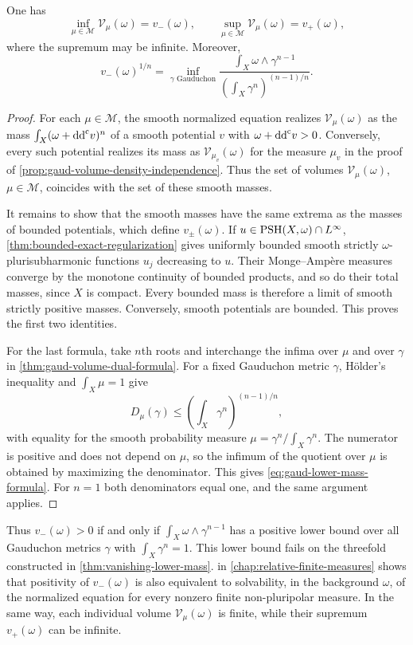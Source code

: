 \begin{theorem}\label{thm:gaud-volume-mass-extrema}
One has
\[
 \inf_{\mu\in\mathscr M}\mathcal V_\mu(\omega)=v_-(\omega),
 \qquad
 \sup_{\mu\in\mathscr M}\mathcal V_\mu(\omega)=v_+(\omega),
\]
where the supremum may be infinite. Moreover,
\begin{equation}\label{eq:gaud-lower-mass-formula}
 v_-(\omega)^{1/n}
 =\inf_{\gamma\text{ Gauduchon}}
 \frac{\displaystyle\int_X\omega\wedge\gamma^{n-1}}
      {\displaystyle\left(\int_X\gamma^n\right)^{(n-1)/n}}.
\end{equation}
\end{theorem}
\begin{proof}
For each $\mu\in\mathscr M$, the smooth normalized equation realizes $\mathcal V_\mu(\omega)$ as the mass $\int_X(\omega+\mathrm{dd}^{\mathrm{c}} v)^n$ of a smooth potential $v$ with $\omega+\mathrm{dd}^{\mathrm{c}} v>0$. Conversely, every such potential realizes its mass as $\mathcal V_{\mu_v}(\omega)$ for the measure $\mu_v$ in the proof of \cref{prop:gaud-volume-density-independence}. Thus the set of volumes $\mathcal V_\mu(\omega)$, $\mu\in\mathscr M$, coincides with the set of these smooth masses.

It remains to show that the smooth masses have the same extrema as the masses of bounded potentials, which define $v_\pm(\omega)$. If $u\in\mathrm{PSH}(X,\omega)\cap L^\infty$, \cref{thm:bounded-exact-regularization} gives uniformly bounded smooth strictly $\omega$-plurisubharmonic functions $u_j$ decreasing to $u$. Their Monge--Amp\`ere measures converge by the monotone continuity of bounded products, and so do their total masses, since $X$ is compact. Every bounded mass is therefore a limit of smooth strictly positive masses. Conversely, smooth potentials are bounded. This proves the first two identities.

For the last formula, take $n$th roots and interchange the infima over $\mu$ and over $\gamma$ in \cref{thm:gaud-volume-dual-formula}. For a fixed Gauduchon metric $\gamma$, H\"older's inequality and $\int_X\mu=1$ give
\[
 D_\mu(\gamma)
 \leq\left(\int_X\gamma^n\right)^{(n-1)/n},
\]
with equality for the smooth probability measure
$\mu=\gamma^n/\int_X\gamma^n$. The numerator is positive and does not depend on $\mu$, so the infimum of the quotient over $\mu$ is obtained by maximizing the denominator. This gives \eqref{eq:gaud-lower-mass-formula}. For $n=1$ both denominators equal one, and the same argument applies.
\end{proof}

Thus $v_-(\omega)>0$ if and only if $\int_X\omega\wedge\gamma^{n-1}$ has a positive lower bound over all Gauduchon metrics $\gamma$ with $\int_X\gamma^n=1$. This lower bound fails on the threefold constructed in \cref{thm:vanishing-lower-mass}.  in \cref{chap:relative-finite-measures} shows that positivity of $v_-(\omega)$ is also equivalent to solvability, in the background $\omega$, of the normalized equation for every nonzero finite non-pluripolar measure. In the same way, each individual volume $\mathcal V_\mu(\omega)$ is finite, while their supremum $v_+(\omega)$ can be infinite.
